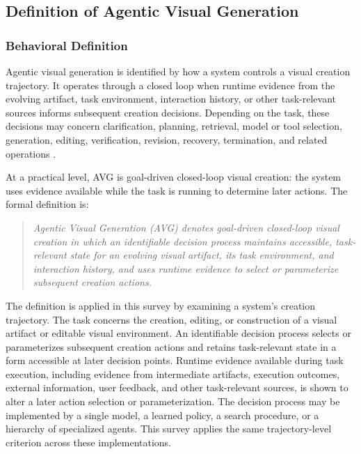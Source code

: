\subsection{Definition of Agentic Visual Generation}
\label{sec:agentic-visual-generation}

\subsubsection{Behavioral Definition}

Agentic visual generation is identified by how a system controls a visual creation trajectory. It operates through a closed loop when runtime evidence from the evolving artifact, task environment, interaction history, or other task-relevant sources informs subsequent creation decisions. Depending on the task, these decisions may concern clarification, planning, retrieval, model or tool selection, generation, editing, verification, revision, recovery, termination, and related operations \cite{xie2024large,durante2024agentai,jiang2024rationality,schneider2025generative}.

At a practical level, AVG is goal-driven closed-loop visual creation: the system uses evidence available while the task is running to determine later actions. The formal definition is:

\begin{quote}
\emph{Agentic Visual Generation (AVG) denotes goal-driven closed-loop visual creation in which an identifiable decision process maintains accessible, task-relevant state for an evolving visual artifact, its task environment, and interaction history, and uses runtime evidence to select or parameterize subsequent creation actions.}
\end{quote}

The definition is applied in this survey by examining a system's creation trajectory. The task concerns the creation, editing, or construction of a visual artifact or editable visual environment. An identifiable decision process selects or parameterizes subsequent creation actions and retains task-relevant state in a form accessible at later decision points. Runtime evidence available during task execution, including evidence from intermediate artifacts, execution outcomes, external information, user feedback, and other task-relevant sources, is shown to alter a later action selection or parameterization. The decision process may be implemented by a single model, a learned policy, a search procedure, or a hierarchy of specialized agents. This survey applies the same trajectory-level criterion across these implementations.

